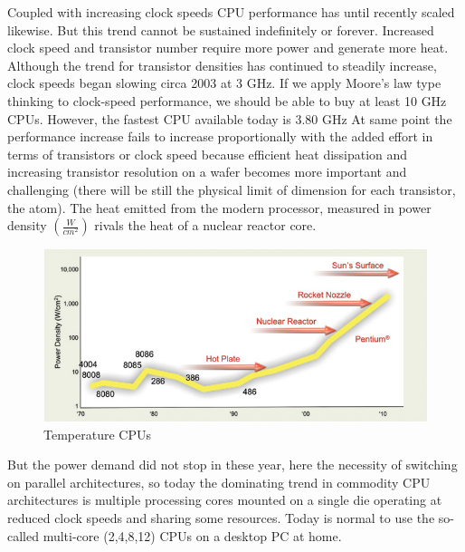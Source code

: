 Coupled with increasing clock speeds CPU performance has until recently scaled
likewise. But this trend cannot be sustained indefinitely or forever.
Increased clock speed and transistor number require more power and generate more
heat. Although the trend for transistor densities has continued to steadily increase,
clock speeds began slowing circa 2003 at 3 GHz. If we apply Moore's law type
thinking to clock-speed performance, we should be able to buy at least 10 GHz CPUs. However, the fastest CPU available today is 3.80 GHz 
At same point the performance increase fails to increase proportionally
with the added effort in terms of transistors or clock speed because efficient
heat dissipation and increasing transistor resolution on a wafer becomes more
important and challenging (there will be still the physical limit of dimension
for each transistor, the atom).
The heat emitted from the modern processor, measured in power
density	\begin{math}(\frac{W}{cm^2})\end{math} rivals
the heat of a nuclear reactor core\cite{Gelsinger2004}.
\begin{figure}[h!]
\centering
\includegraphics[scale=0.7]{./images/temperatureCPU}
\caption{Temperature CPUs}\label{tempCPU}
\end{figure}
But the power demand did not stop in these year, here the necessity of
switching on parallel architectures, so today the dominating trend in commodity CPU
architectures is multiple processing cores mounted on a single die operating at
reduced clock speeds and sharing some resources. Today is normal to use the so-called
multi-core (2,4,8,12) CPUs on a desktop PC at home.



